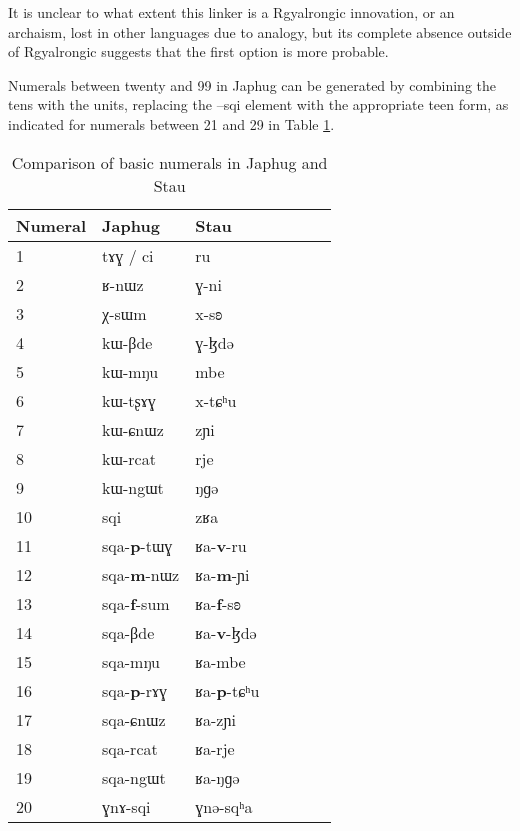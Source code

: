 \documentclass[oldfontcommands,oneside,a4paper,12pt]{article}
\newcommand{\ipa}[1]{{\phon#1}}
\newcommand{\grise}[1]{\cellcolor{lightgray}\textbf{#1}}
\begin{document}
It is unclear to what extent this linker is a Rgyalrongic innovation, or an archaism, lost in other languages due to  analogy, but its complete absence outside of Rgyalrongic suggests that the first option is more probable.


Numerals between  twenty  and 99 in Japhug can be generated by combining the tens with the units, replacing the \ipa{--sqi} element with the appropriate teen form, as indicated for numerals between 21 and 29 in Table \ref{tab:num.simple}.

\begin{table}[H]
\caption{Comparison of basic numerals in Japhug and Stau}  \label{tab:num.simple} \centering
\begin{tabular}{lllllll}
\toprule
Numeral & Japhug & Stau \\
\midrule
1	&	\ipa{tɤɣ} / \ipa{ci} &	\ipa{ru}  &	\\
2	&	\ipa{ʁ-nɯz}  &	\ipa{ɣ-ni}  &	\\
3	&	\ipa{χ-sɯm}  &	\ipa{x-sʚ}  &	\\
4	&	\ipa{kɯ-βde}  &	\ipa{ɣ-ɮdə}  &	\\
5	&	\ipa{kɯ-mŋu}  &	\ipa{mbe}  &	\\
6	&	\ipa{kɯ-tʂɤɣ}  &	\ipa{x-tɕʰu}  &	\\
7	&	\ipa{kɯ-ɕnɯz}  &	\ipa{zɲi}  &	\\
8	&	\ipa{kɯ-rcat}  &	\ipa{rje}  &	\\
9	&	\ipa{kɯ-ngɯt}  &	\ipa{ŋɡə}  &	\\
10	&	\ipa{sqi}  &	\ipa{zʁa}  &	\\
\midrule
11	&	\ipa{sqa-\textbf{p}-tɯɣ} \grise &	\ipa{ʁa-\textbf{v}-ru}  \grise&	\\
12	&	\ipa{sqa-\textbf{m}-nɯz} \grise &	\ipa{ʁa-\textbf{m}-ɲi}  \grise&	\\
13	&	\ipa{sqa-\textbf{f}-sum}  \grise&	\ipa{ʁa-\textbf{f}-sʚ} \grise &	\\
14	&	\ipa{sqa-βde}  &	\ipa{ʁa-\textbf{v}-ɮdə}  \grise&	\\
15	&	\ipa{sqa-mŋu}  &	\ipa{ʁa-mbe}  &	\\
16	&	\ipa{sqa-\textbf{p}-rɤɣ}  \grise&	\ipa{ʁa-\textbf{p}-tɕʰu}  \grise&	\\
17	&	\ipa{sqa-ɕnɯz}  &	\ipa{ʁa-zɲi}  &	\\
18	&	\ipa{sqa-rcat}  &	\ipa{ʁa-rje}  &	\\
19	&	\ipa{sqa-ngɯt}  &	\ipa{ʁa-ŋɡə}  &	\\
20	&	\ipa{ɣnɤ-sqi}  &	\ipa{ɣnə-sqʰa}  &	\\
\midrule

\end{tabular}
\end{table}
\end{document}
